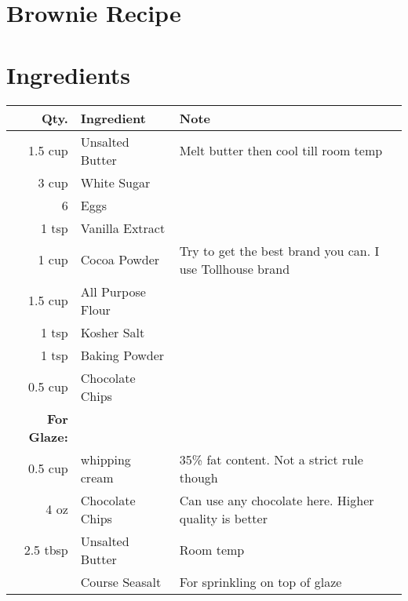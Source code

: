 \documentclass{report}
\theoremstyle{plain} %
\theoremstyle{definition} %
\theoremstyle{plain} %
\begin{document}
\section*{Brownie Recipe}
\section*{Ingredients}
\begin{tabular}{r|l|l}
Qty. & Ingredient & Note\\
\hline
1.5 cup & Unsalted Butter & Melt butter then cool till room temp\\
3 cup & White Sugar\\
6 & Eggs\\
1 tsp & Vanilla Extract\\
1 cup & Cocoa Powder & Try to get the best brand you can. I use Tollhouse brand\\
1.5 cup & All Purpose Flour\\
1 tsp & Kosher Salt\\
1 tsp & Baking Powder\\
0.5 cup & Chocolate Chips\\
\hline
\textbf{For Glaze:}\\
\hline
0.5 cup & whipping cream & 35\% fat content. Not a strict rule though\\
4 oz & Chocolate Chips & Can use any chocolate here. Higher quality is better\\
2.5 tbsp & Unsalted Butter & Room temp\\
{} & Course Seasalt & For sprinkling on top of glaze
\end{tabular}
\end{document}
